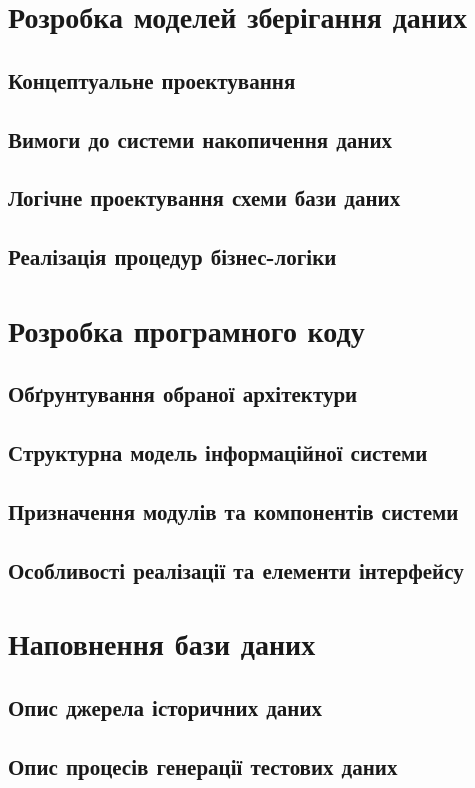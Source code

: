 \documentclass[oneside,14pt]{extarticle}
\begin{document}
\section{Розробка моделей зберігання даних}
\subsection{Концептуальне проектування}
\subsection{Вимоги до системи накопичення даних}
\subsection{Логічне проектування схеми бази даних}
\subsection{Реалізація процедур бізнес-логіки}
\newpage

\section{Розробка програмного коду}
\subsection{Обґрунтування обраної архітектури}
\subsection{Структурна модель інформаційної системи}
\subsection{Призначення модулів та компонентів системи}
\subsection{Особливості реалізації та елементи інтерфейсу}
\newpage

\section{Наповнення бази даних}
\subsection{Опис джерела історичних даних}
\subsection{Опис процесів генерації тестових даних}
\end{document}
